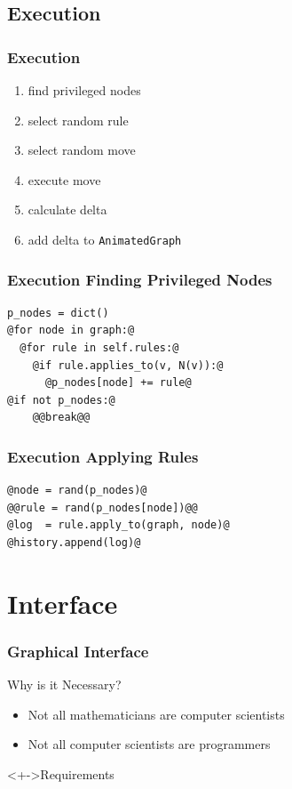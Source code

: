 \documentclass{beamer}
\begin{document}
\subsection{Execution}
\begin{frame}
  \frametitle{Execution}
  \begin{enumerate}[<+->]
  \item find privileged nodes
  \item select random rule
  \item select random move
  \item execute move
  \item calculate delta
  \item add delta to \texttt{AnimatedGraph}
  \end{enumerate}
\end{frame}
\begin{frame}[fragile]
  \frametitle{Execution \Dash Finding Privileged Nodes}
\begin{lstlisting}[style=pystep]
p_nodes = dict()
@for node in graph:@
  @for rule in self.rules:@
    @if rule.applies_to(v, N(v)):@
      @p_nodes[node] += rule@
@if not p_nodes:@
    @@break@@
\end{lstlisting}
\end{frame}
\begin{frame}[fragile]
  \frametitle{Execution \Dash Applying Rules}
\begin{lstlisting}[style=pystep]
@node = rand(p_nodes)@
@@rule = rand(p_nodes[node])@@
@log  = rule.apply_to(graph, node)@
@history.append(log)@
\end{lstlisting}
\end{frame}

\section{Interface}
\ifTOC\frame{\tableofcontents[currentsection]}\fi
\begin{frame}
  \frametitle{Graphical Interface}
  \begin{block}{Why is it Necessary?}
    \begin{itemize}[<+->]
    \item Not all mathematicians are computer scientists
    \item Not all computer scientists are programmers
    \end{itemize}
  \end{block}
  \begin{block}<+->{Requirements}
  \end{block}
\end{frame}
\end{document}
